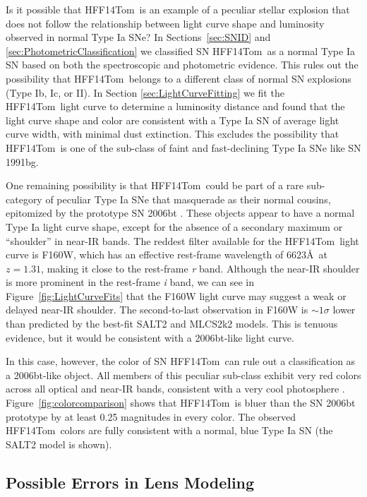\documentclass[iop]{emulateapj}
\def\tomas{HFF14Tom}
\begin{document}
Is it possible that \tomas\ is an example of a peculiar stellar
explosion that does not follow the relationship between light curve
shape and luminosity observed in normal Type Ia SNe?  In
Sections~\ref{sec:SNID} and \ref{sec:PhotometricClassification} we
classified SN \tomas\ as a normal Type Ia SN based on both the
spectroscopic and photometric evidence.  This rules out the
possibility that \tomas\ belongs to a different class of normal SN
explosions (Type Ib, Ic, or II). In
Section \ref{sec:LightCurveFitting} we fit the \tomas\ light curve to
determine a luminosity distance and found that the light curve shape
and color are consistent with a Type Ia SN of average light curve
width, with minimal dust extinction.  This excludes the possibility
that \tomas\ is one of the sub-class of faint and fast-declining Type
Ia SNe like SN 1991bg.

One remaining possibility is that \tomas\ could be part of a rare
sub-category of peculiar Type Ia SNe that masquerade as their normal
cousins, epitomized by the prototype SN 2006bt \citep{Foley:2010}.
These objects appear to have a normal Type Ia light curve shape,
except for the absence of a secondary maximum or ``shoulder'' in
near-IR bands.  The reddest filter available for the \tomas\ light
curve is F160W, which has an effective rest-frame wavelength of
6623\AA\ at $z=1.31$, making it close to the rest-frame {\it r} band.
Although the near-IR shoulder is more prominent in the rest-frame {\it
i} band, we can see in Figure~\ref{fig:LightCurveFits} that the F160W
light curve may suggest a weak or delayed near-IR shoulder.  The
second-to-last observation in F160W is $\sim1\sigma$ lower than
predicted by the best-fit SALT2 and MLCS2k2 models. This is tenuous
evidence, but it would be consistent with a 2006bt-like light curve.

In this case, however, the color of SN \tomas\ can rule out a
classification as a 2006bt-like object.  All members of this peculiar
sub-class exhibit very red colors across all optical and near-IR
bands, consistent with a very cool photosphere \citep{Foley:2010}.
Figure~\ref{fig:colorcomparison} shows that \tomas\ is bluer than the
SN 2006bt prototype by at least 0.25 magnitudes in every color. The
observed \tomas\ colors are fully consistent with a normal, blue
Type Ia SN (the SALT2 model is shown).



\subsection{Possible Errors in Lens Modeling}
\label{sec:LensModelErrors}
\end{document}
